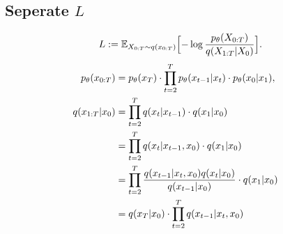 \documentclass[
]{article}
\theoremstyle{remark}
\begin{document}
\subsection{\texorpdfstring{Seperate
\(L\)}{Seperate L}}\label{seperate-l}

\[
\begin{aligned}
  L :=
  \mathbb E_{X_{0:T}\sim q(x_{0:T})} \Bigl[ -\log \frac{p_{\theta}(X_{0:T})}{q(X_{1:T}\vert X_0)} \Bigr].
\end{aligned}
\] \[
\begin{aligned}
  p_{\theta}(x_{0:T}) &= p_{\theta}(x_T) \cdot \prod_{t=2}^T p_{\theta}(x_{t-1}\vert x_t) \cdot  p_{\theta}(x_0\vert x_1) , \cr 
  q(x_{1:T}\vert x_0) &= \prod_{t=2}^{T} q(x_t \vert x_{t-1}) \cdot q(x_1\vert x_0) \cr 
  &= \prod_{t=2}^{T} q(x_t \vert x_{t-1}, x_0) \cdot q(x_1\vert x_0) \cr 
  &= \prod_{t=2}^{T} \frac{q(x_{t-1} \vert x_{t}, x_0) q(x_t\vert x_0) }{q(x_{t-1}\vert x_0)} \cdot q(x_1\vert x_0) \cr 
  &= q(x_T\vert x_0) \cdot \prod_{t=2}^{T} q(x_{t-1} \vert x_{t}, x_0)
\end{aligned}
\]
\end{document}
